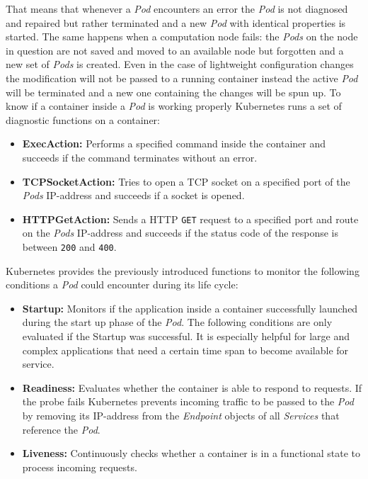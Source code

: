 \begin{itemize}
{    That means that whenever a \textit{Pod} encounters an error the \textit{Pod} is not diagnosed and repaired but rather terminated and a new \textit{Pod} with identical properties is started.
    The same happens when a computation node fails: the \textit{Pods} on the node in question are not saved and moved to an available node but forgotten and a new set of \textit{Pods} is created.
    Even in the case of lightweight configuration changes the modification will not be passed to a running container instead the active \textit{Pod} will be terminated and a new one containing the changes will be spun up.
    To know if a container inside a \textit{Pod} is working properly Kubernetes runs a set of diagnostic functions on a container:
    \begin{itemize}
        \item[] {\textbf{ExecAction:} Performs a specified command inside the container and succeeds if the command terminates without an error.}
        \item[] {\textbf{TCPSocketAction:} Tries to open a TCP socket on a specified port of the \textit{Pods} IP-address and succeeds if a socket is opened.}
        \item[] {\textbf{HTTPGetAction:} Sends a HTTP \texttt{GET} request to a specified port and route on the \textit{Pods} IP-address and succeeds if the status code of the response is between \texttt{200} and \texttt{400}.}
    \end{itemize}
    Kubernetes provides the previously introduced functions to monitor the following conditions a \textit{Pod} could encounter during its life cycle:
    \begin{itemize}
        \item[] {\textbf{Startup:} Monitors if the application inside a container successfully launched during the start up phase of the \textit{Pod}.
        The following conditions are only evaluated if the Startup was successful.
        It is especially helpful for large and complex applications that need a certain time span to become available for service.
        }
        \item[] {\textbf{Readiness:} Evaluates whether the container is able to respond to requests.
        If the probe fails Kubernetes prevents incoming traffic to be passed to the \textit{Pod} by removing its IP-address from the \textit{Endpoint} objects of all \textit{Services} that reference the \textit{Pod}.
        }
        \item[] {\textbf{Liveness:} Continuously checks whether a container is in a functional state to process incoming requests.
}
\end{itemize}}
\end{itemize}
